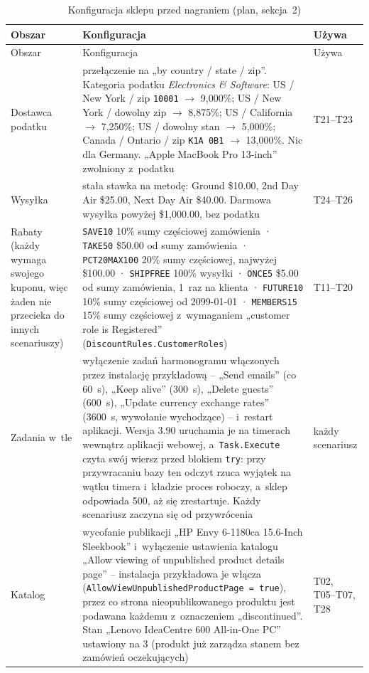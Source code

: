 {\footnotesize
\begin{xltabular}{\linewidth}{@{}>{\raggedright\arraybackslash}p{2.4cm} >{\raggedright\arraybackslash}X >{\raggedright\arraybackslash}p{2.1cm}@{}}
\caption{Konfiguracja sklepu przed nagraniem (plan, sekcja~2)}\label{tab:bench-konfig}\\
\toprule
Obszar & Konfiguracja & Używa \\
\midrule
\endfirsthead
\toprule
Obszar & Konfiguracja & Używa \\
\midrule
\endhead
\bottomrule
\endlastfoot
Dostawca podatku & przełączenie na „by country / state / zip”. Kategoria podatku
  \emph{Electronics \& Software}: US / New York / zip \texttt{10001} $\rightarrow$
  9,000\%; US / New York / dowolny zip $\rightarrow$ 8,875\%; US / California
  $\rightarrow$ 7,250\%; US / dowolny stan $\rightarrow$ 5,000\%; Canada / Ontario / zip
  \texttt{K1A 0B1} $\rightarrow$ 13,000\%. Nic dla Germany. „Apple MacBook Pro 13-inch”
  zwolniony z~podatku & T21--T23 \\
Wysyłka & stała stawka na metodę: Ground \$10.00, 2nd Day Air \$25.00, Next Day Air
  \$40.00. Darmowa wysyłka powyżej \$1,000.00, bez podatku & T24--T26 \\
Rabaty (każdy wymaga swojego kuponu, więc żaden nie przecieka do innych scenariuszy) &
  \texttt{SAVE10} 10\% sumy częściowej zamówienia · \texttt{TAKE50} \$50.00 od sumy
  zamówienia · \texttt{PCT20MAX100} 20\% sumy częściowej, najwyżej \$100.00 ·
  \texttt{SHIPFREE} 100\% wysyłki · \texttt{ONCE5} \$5.00 od sumy zamówienia, 1~raz na
  klienta · \texttt{FUTURE10} 10\% sumy częściowej od 2099-01-01 · \texttt{MEMBERS15}
  15\% sumy częściowej z~wymaganiem „customer role is Registered”
  (\texttt{DiscountRules.CustomerRoles}) & T11--T20 \\
Zadania w~tle & wyłączenie zadań harmonogramu włączonych przez instalację przykładową --
  „Send emails” (co 60~s), „Keep alive” (300~s), „Delete guests” (600~s), „Update
  currency exchange rates” (3600~s, wywołanie wychodzące) -- i~restart aplikacji. Wersja
  3.90 uruchamia je na timerach wewnątrz aplikacji webowej, a~\texttt{Task.Execute} czyta
  swój wiersz przed blokiem \texttt{try}: przy przywracaniu bazy ten odczyt rzuca wyjątek
  na wątku timera i~kładzie proces roboczy, a~sklep odpowiada 500, aż się zrestartuje.
  Każdy scenariusz zaczyna się od przywrócenia & każdy scenariusz \\
Katalog & wycofanie publikacji „HP Envy 6-1180ca 15.6-Inch Sleekbook” i~wyłączenie
  ustawienia katalogu „Allow viewing of unpublished product details page” -- instalacja
  przykładowa je włącza (\texttt{AllowViewUnpublishedProductPage = true}), przez co strona
  nieopublikowanego produktu jest podawana każdemu z~oznaczeniem „discontinued”. Stan
  „Lenovo IdeaCentre 600 All-in-One PC” ustawiony na 3 (produkt już zarządza stanem bez
  zamówień oczekujących) & T02, T05--T07, T28 \\
\end{xltabular}
}

